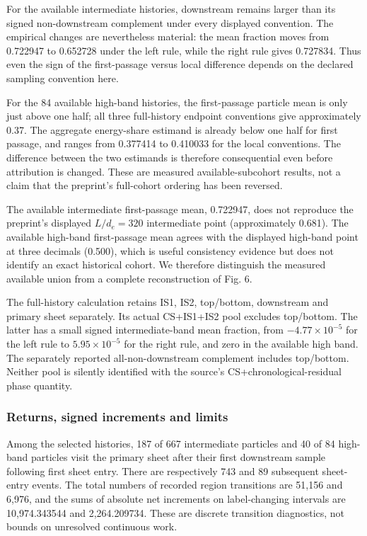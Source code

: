 For the available intermediate histories, downstream remains larger than
its signed non-downstream complement under every displayed convention.
The empirical changes are nevertheless material: the mean fraction moves
from 0.722947 to 0.652728 under the left rule, while the right rule
gives 0.727834. Thus even the sign of the first-passage versus local
difference depends on the declared sampling convention here.

For the 84 available high-band histories, the first-passage particle
mean is only just above one half; all three full-history endpoint
conventions give approximately 0.37. The aggregate energy-share estimand
is already below one half for first passage, and ranges from 0.377414 to
0.410033 for the local conventions. The difference between the two
estimands is therefore consequential even before attribution is changed.
These are measured available-subcohort results, not a claim that the
preprint's full-cohort ordering has been reversed.

The available intermediate first-passage mean, 0.722947, does not
reproduce the preprint's displayed \(L/d_e=320\) intermediate point
(approximately 0.681). The available high-band first-passage mean agrees
with the displayed high-band point at three decimals (0.500), which is
useful consistency evidence but does not identify an exact historical
cohort. We therefore distinguish the measured available union from a
complete reconstruction of Fig. 6.

The full-history calculation retains IS1, IS2, top/bottom, downstream
and primary sheet separately. Its actual CS+IS1+IS2 pool excludes
top/bottom. The latter has a small signed intermediate-band mean
fraction, from \(-4.77\times10^{-5}\) for the left rule to
\(5.95\times10^{-5}\) for the right rule, and zero in the available high
band. The separately reported all-non-downstream complement includes
top/bottom. Neither pool is silently identified with the source's
CS+chronological-residual phase quantity.

\subsubsection{Returns, signed increments and
limits}\label{returns-signed-increments-and-limits}

Among the selected histories, 187 of 667 intermediate particles and 40
of 84 high-band particles visit the primary sheet after their first
downstream sample following first sheet entry. There are respectively
743 and 89 subsequent sheet-entry events. The total numbers of recorded
region transitions are 51,156 and 6,976, and the sums of absolute net
increments on label-changing intervals are 10,974.343544 and
2,264.209734. These are discrete transition diagnostics, not bounds on
unresolved continuous work.

